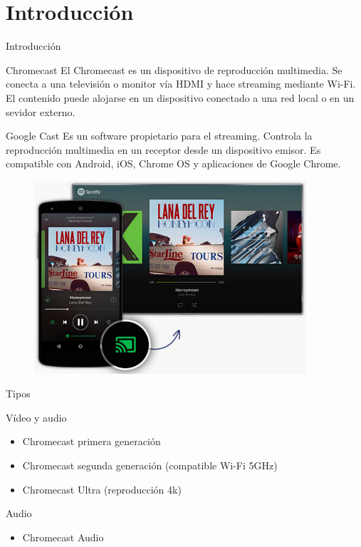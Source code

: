 \section{Introducción}

\begin{frame}{Introducción}
	\begin{block}{Chromecast}
	El Chromecast es un dispositivo de reproducción multimedia. Se conecta a una televisión o monitor vía HDMI y hace streaming mediante Wi-Fi.
	El contenido puede alojarse en un dispositivo conectado a una red local o en un sevidor externo.
	\end{block}

	\begin{block}{Google Cast}
	Es un software propietario para el streaming. Controla la reproducción multimedia en un receptor desde un dispositivo emisor.
	Es compatible con Android, iOS, Chrome OS y aplicaciones de
	Google Chrome.
	\end{block}
\end{frame}


\begin{frame}
	\begin{figure}[H]
		\centering
		\includegraphics[width=0.9\textwidth]{./Imagenes/spotify-chromecast.png}
	\end{figure}
\end{frame}


\begin{frame}{Tipos}
	\begin{exampleblock}{Vídeo y audio}
		\begin{itemize}
			\item Chromecast primera generación
			\item Chromecast segunda generación (compatible Wi-Fi 5GHz)
			\item Chromecast Ultra (reproducción 4k)
		\end{itemize}
	\end{exampleblock}

	\begin{exampleblock}{Audio}
		\begin{itemize}
			\item  Chromecast Audio
		\end{itemize}
	\end{exampleblock}
\end{frame}


